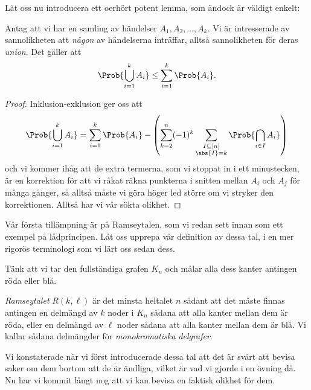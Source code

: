 \documentclass[nobib]{tufte-handout}
\begin{document}
Låt oss nu introducera ett oerhört potent lemma, som ändock är väldigt enkelt:

\begin{lemma}[Unionsbegränsning]\label{union_bound}
    Antag att vi har en samling av händelser $A_1, A_2, \ldots, A_k$. Vi är intresserade av sannolikheten att \emph{någon} av händelserna inträffar, alltså sannolikheten för deras \emph{union}. Det gäller att
    $$\Prob{\bigcup_{i=1}^k A_i} \leq \sum_{i=1}^{k} \Prob{A_i}.$$

    \begin{proof}
        Inklusion-exklusion ger oss att
        $$\Prob{\bigcup_{i=1}^k A_i} = \sum_{i=1}^{k} \Prob{A_i} - \left(\sum_{k=2}^{n} (-1)^{k}\sum_{\substack{I \subseteq [n]\\\abs{I} = k}} \Prob{\bigcap_{i\in I} A_i}\right)$$
        och vi kommer ihåg att de extra termerna, som vi stoppat in i ett minustecken, är en korrektion för att vi råkat räkna punkterna i snitten mellan $A_i$ och $A_j$ för många gånger, så alltså måste vi göra höger led större om vi stryker den korrektionen. Alltså har vi vår sökta olikhet.
    \end{proof}
\end{lemma}

Vår första tillämpning är på Ramseytalen, som vi redan sett innan som ett exempel på lådprincipen. Låt oss upprepa vår definition av dessa tal, i en mer rigorös terminologi som vi lärt oss sedan dess.

\begin{definition}
    Tänk att vi tar den fullständiga grafen $K_n$ och målar alla dess kanter antingen röda eller blå.

    \emph{Ramseytalet} $R(k,\ell)$ är det minsta heltalet $n$ sådant att det måste finnas antingen en delmängd av $k$ noder i $K_n$ sådana att alla kanter mellan dem är röda, eller en delmängd av $\ell$ noder sådana att alla kanter mellan dem är blå. Vi kallar sådana delmängder för \emph{monokromatiska delgrafer}.
\end{definition}

Vi konstaterade när vi först introducerade dessa tal att det är svårt att bevisa saker om dem bortom att de är ändliga, vilket är vad vi gjorde i en övning då. Nu har vi kommit långt nog att vi kan bevisa en faktisk olikhet för dem.
\end{document}
